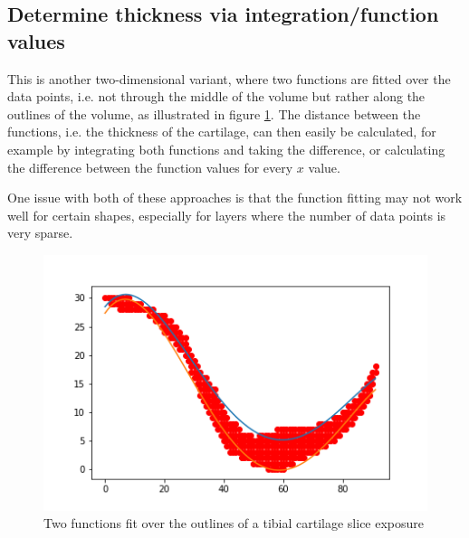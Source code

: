 \subsection{Determine thickness via integration/function values}
This is another two-dimensional variant, where two functions are fitted over the data points, i.e. not through the middle of the volume but rather along the outlines of the volume, as illustrated in figure \ref{fig:integration}. The distance between the functions, i.e. the thickness of the cartilage, can then easily be calculated, for example by integrating both functions and taking the difference, or calculating the difference between the function values for every $x$ value.
\par
One issue with both of these approaches is that the function fitting may not work well for certain shapes, especially for layers where the number of data points is very sparse.
\begin{figure}[htb!]
	\centering
	\includegraphics[width=\linewidth]{./figures/integration}
	\caption{Two functions fit over the outlines of a tibial cartilage slice exposure}
	\label{fig:integration}
\end{figure}